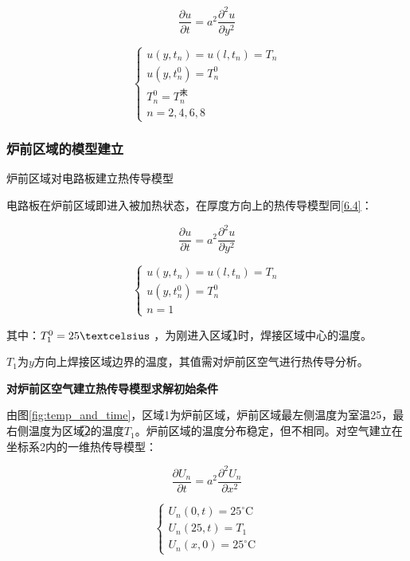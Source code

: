 \documentclass[withoutpreface,bwprint]{cumcmthesis} %
\numberwithin{equation}{subsection}
\begin{document}
$$\frac{\partial u}{\partial t}= a^2\frac{\partial^2 u}{\partial y^2}$$

\begin{equation}
	\left\{ \begin{array}{l}
			u\left(y,t_{n} \right) =u\left(l,t_{n} \right)=T_{n}\\
			u\left(y,t_{n}^0 \right) =T_{n}^0\\
			T_{n}^0= T_{n}^\text{末}\\
			n=2,4,6,8
		\end{array}\right.
	\label{6.4}
\end{equation}

\subsubsection{炉前区域的模型建立}

\noindent 炉前区域对电路板建立热传导模型

电路板在炉前区域即进入被加热状态，在厚度方向上的热传导模型同\eqref{6.4}：

$$\frac{\partial u}{\partial t}= a^2\frac{\partial^2 u}{\partial y^2}$$

\begin{equation}
	\left\{ \begin{array}{l}
		u\left(y,t_{n} \right) =u\left(l,t_{n} \right)=T_{n}\\
		u\left(y,t_{n}^0 \right) =T_{n}^0\\
		n=1
	\end{array}\right.
	\label{6.5}
\end{equation}

\noindent 其中：$T_{1}^0=25\textcelsius$ ，为刚进入区域\textcircled{1}时，焊接区域中心的温度。

$T_{1}$为$y$方向上焊接区域边界的温度，其值需对炉前区空气进行热传导分析。

\noindent \textbf{对炉前区空气建立热传导模型求解初始条件}

由图\ref{fig:temp_and_time}，区域1为炉前区域，炉前区域最左侧温度为室温25\textcelsius，最右侧温度为区域\textcircled{2}的温度$T_{1}$。炉前区域的温度分布稳定，但不相同。对空气建立在坐标系2内的一维热传导模型：

\begin{equation}
	\frac{\partial U_{n}}{\partial t}=a^{2} \frac{\partial^{2} U_{n}}{\partial x^{2}}
	\label{6.6}
\end{equation}

\begin{equation}
	\left\{\begin{array}{l}
	U_{n}(0, t)=25^{\circ} \mathrm{C} \\
	U_{n}(25, t)=T_{1} \\
	U_{n}(x, 0)=25^{\circ} \mathrm{C}
	\end{array}\right.
	\label{6.7}
\end{equation}
\end{document}
